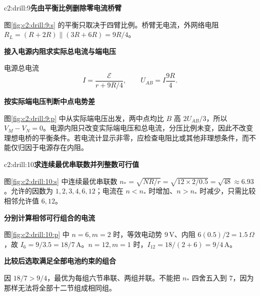 \begin{drillsolution}{c2:drill:9}\textbf{先由平衡比例删除零电流桥臂}\par\nobreak
图\ref{fig:c2:drill:9:s} 的平衡只取决于四臂比例。桥臂无电流，外网络电阻 $R_L=(R+2R)\parallel(3R+6R)=9R/4$。

\par\medskip{}\noindent\textbf{接入电源内阻求实际总电流与端电压}\par\nobreak
电源总电流
\[
 I=\frac{\mathcal E}{r+9R/4},\qquad
 U_{AB}=I\frac{9R}{4}.
\]



\par\medskip{}\noindent\textbf{按实际端电压判断中点电势差}\par\nobreak
图\ref{fig:c2:drill:9:p} 中从实际端电压出发，两中点均比 $B$ 高 $2U_{AB}/3$，所以 $V_M-V_N=0$。电源内阻只改变实际端电压和总电流，分压比例未变，因此不改变理想电桥的平衡条件。若电流计显示非零，应检查电阻比或其他非理想条件，而不能仅归因于电源存在内阻。\end{drillsolution}
\begin{drillsolution}{c2:drill:10}\textbf{求连续最优串联数并列整数可行值}\par\nobreak
图\ref{fig:c2:drill:10:s} 中连续最优串联数 $n_*=\sqrt{NR/r}=\sqrt{12\times2/0.5}=\sqrt{48}\approx6.93$。允许的因数为 $1,2,3,4,6,12$；电流在 $n<n_*$ 时增加、$n>n_*$ 时减少，只需比较相邻允许值 $6,12$。



\par\medskip{}\noindent\textbf{分别计算相邻可行组合的电流}\par\nobreak
图\ref{fig:c2:drill:10:p} 中 $n=6,m=2$ 时，等效电动势 $9\,\mathrm V$、内阻 $6(0.5)/2=1.5\,\Omega$，故 $I_6=9/3.5=18/7\,\mathrm A$。$n=12,m=1$ 时，$I_{12}=18/(2+6)=9/4\,\mathrm A$。

\par\medskip{}\noindent\textbf{比较后选取满足全部电池约束的组合}\par\nobreak
因 $18/7>9/4$，最优为每组六节串联、两组并联。不能把 $n_*$ 四舍五入到 $7$，因为那样无法将全部十二节组成相同组。\end{drillsolution}
